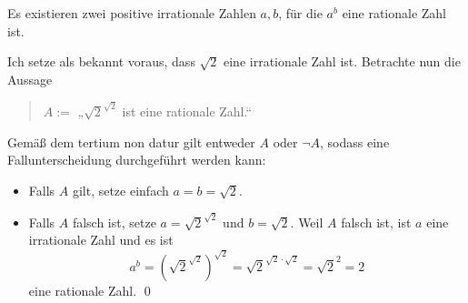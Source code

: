 \begin{bsp}
    Es existieren zwei positive irrationale Zahlen $a,b$, für die $a^b$ eine rationale Zahl ist.
\end{bsp}


\begin{bew}
    Ich setze als bekannt voraus, dass $\sqrt{2}$ eine irrationale Zahl ist. Betrachte nun die Aussage
    \begin{quote}
        $A:=$ „$\sqrt{2}^{\sqrt{2}}$ ist eine rationale Zahl.“
    \end{quote}
    Gemäß dem tertium non datur gilt entweder $A$ oder $\neg A$, sodass eine Fallunterscheidung durchgeführt werden kann:
    \begin{itemize}
        \item Falls $A$ gilt, setze einfach $a=b=\sqrt{2}$.
        \item Falls $A$ falsch ist, setze $a=\sqrt{2}^{\sqrt{2}}$ und $b=\sqrt{2}$. Weil $A$ falsch ist, ist $a$ eine irrationale Zahl und es ist
            \[ a^b = (\sqrt{2}^{\sqrt{2}})^{\sqrt{2}} = \sqrt{2}^{\sqrt{2}\cdot\sqrt{2}} = \sqrt{2}^2 = 2 \]
        eine rationale Zahl. \qed
    \end{itemize}
\end{bew}


